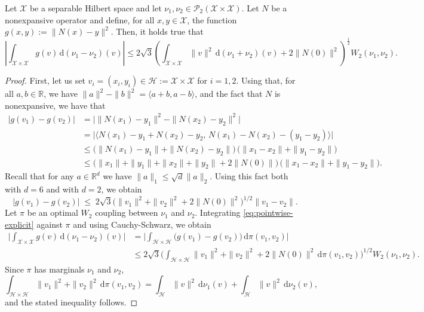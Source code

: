 \documentclass[onefignum,onetabnum]{siamonline250211}
\newcommand{\cX}{\mathcal{X}}
\begin{document}
\begin{lemma}\label{lem:Gamma_help}
Let $\mathcal{X}$ be a separable Hilbert space and let $\nu_1,\nu_2\in\mathcal P_2(\cX\times \cX)$. Let $N$ be a nonexpansive operator and define, for all $x, y\in\cX$, the function $g(x,y):=\|N(x)-y\|^2$. Then, it holds true that
\[
\left|\int_{\cX\times \cX} g(v) \, \mathrm{d}(\nu_1-\nu_2)(v)\right|\leq 2\sqrt{3} \left( \int_{\cX\times \cX} \|v\|^2 \, \mathrm{d}(\nu_1+\nu_2)(v) + 2\|N(0)\|^2\right)^{\frac{1}{2}} W_2(\nu_1,\nu_2). 
\]
\end{lemma}
\begin{proof}
First, let us set $v_i=(x_i,y_i)\in \mathcal{H}:=\cX \times \cX$ for $i=1,2$. Using that, for all $a, b\in\mathbb{R}$, we have $\|a\|^{2}-\|b\|^{2}=\langle a+b,a-b\rangle$, and the fact that $N$ is nonexpansive, we have that
\begin{align*}
|g(v_1)-g(v_2)|
&=\big|\|N(x_1)-y_1\|^{2}-\|N(x_2)-y_2\|^{2}\big|\\
&=\big|\langle N(x_1)-y_1+N(x_2)-y_2,\,
            N(x_1)-N(x_2)-(y_1-y_2)\rangle\big|\\
&\le \big(\|N(x_1)-y_1\|+\|N(x_2)-y_2\|\big)\,
       \big(\|x_1-x_2\|+\|y_1-y_2\|\big)\\
&\le \big(\|x_1\|+\|y_1\|+\|x_2\|+\|y_2\|+2\|N(0)\|\big)\,
      \big(\|x_1-x_2\|+\|y_1-y_2\|\big).
\end{align*}
Recall that for any $a\in \mathbb{R}^d$ we have $\|a\|_1\leq \sqrt{d}\|a\|_2$. Using this fact both with $d = 6$ and with $d=2$, we obtain
\begin{equation}\label{eq:pointwise-explicit}
|g(v_1)-g(v_2)|
\;\le\;
2\sqrt{3}
\Big(\|v_1\|^{2}+\|v_2\|^{2}+2\|N(0)\|^{2}\Big)^{1/2} \|v_1-v_2\|.
\end{equation}
Let $\pi$ be an optimal $W_{2}$ coupling between $\nu_1$ and $\nu_2$. Integrating \eqref{eq:pointwise-explicit} against $\pi$ and using Cauchy-Schwarz, we obtain
\begin{align*}
\Big|\int_{\cX\times \cX} g(v)\,\mathrm{d}(\nu_1-\nu_2)(v)\Big|
&=\Big|\int_{\mathcal{H}\times \mathcal{H}}\big(g(v_1)-g(v_2)\big)\,\mathrm{d}\pi(v_1,v_2)\Big|\\
&\le 2\sqrt{3}\Big(\int_{\mathcal{H}\times \mathcal{H}}\|v_1\|^{2}+\|v_2\|^{2}+2\|N(0)\|^{2}\,\mathrm{d}\pi(v_1,v_2)\Bigg)^{1/2} W_{2}(\nu_1,\nu_2).
\end{align*}
Since $\pi$ has marginals $\nu_1$ and $\nu_2$,
\[
\int_{ \mathcal{H}\times\mathcal{H}}\|v_1\|^{2}+\|v_2\|^{2}\,\mathrm{d}\pi(v_1,v_2)
=\int_{\mathcal{H}}\!\|v\|^{2}\,\mathrm{d}\nu_1(v)+\int_\mathcal{H}\!\|v\|^{2}\,\mathrm{d}\nu_2(v),
\]
and the stated inequality follows.
\end{proof}
\end{document}
